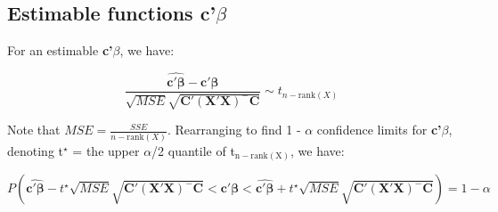 \documentclass[11pt]{article}
\begin{document}
\subsection{Estimable functions \textbf{c'$\beta$}}
\label{sec-2-2}


For an estimable \textbf{c'$\beta$}, we have:

$$\frac{\widehat{\mathbf{c'\beta}} -
\mathbf{c'\beta}}{\sqrt{MSE}\sqrt{\mathbf{C'(X'X)^{-}C}}} \sim
t_{n-\mathrm{rank}(X)}$$

Note that $MSE = \frac{SSE}{n-\mathrm{rank}(X)}$. Rearranging to find 1 - $\alpha$ confidence limits for \textbf{c'$\beta$},
denoting t$^{\star}$ = the upper $\alpha$/2 quantile of t$_{\mathrm{n-rank(X)}}$, we
have:

$$P\left( \widehat{\mathbf{c'\beta}} -
t^{\star}\sqrt{MSE}\sqrt{\mathbf{C'(X'X)^{-}C}} < \mathbf{c'\beta} <  \widehat{\mathbf{c'\beta}} +
t^{\star}\sqrt{MSE}\sqrt{\mathbf{C'(X'X)^{-}C}} \right) = 1 - \alpha$$
\end{document}
